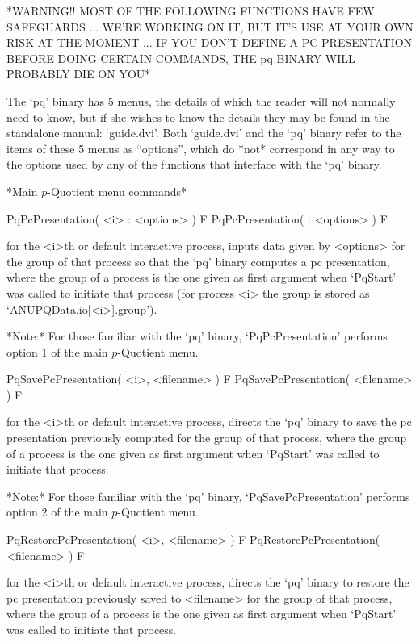 
*WARNING!! MOST OF THE FOLLOWING FUNCTIONS HAVE FEW SAFEGUARDS ... WE'RE
 WORKING ON IT, BUT IT'S USE AT YOUR OWN RISK AT THE MOMENT ... IF YOU
 DON'T DEFINE A PC PRESENTATION BEFORE DOING CERTAIN COMMANDS, THE pq
 BINARY WILL PROBABLY DIE ON YOU*

The `pq' binary has 5 menus, the details of which  the  reader  will  not
normally need to know, but if she wishes to know the details they may  be
found in the standalone manual: `guide.dvi'.  Both  `guide.dvi'  and  the
`pq' binary refer to the items of these 5 menus as ``options'', which  do
*not* correspond in any way to the options used  by  any  of  the  {\GAP}
functions that interface with the `pq' binary.

*Main $p$-Quotient menu commands*

\>PqPcPresentation( <i> : <options> ) F
\>PqPcPresentation( : <options> ) F

for the <i>th or default interactive {\ANUPQ} process, inputs data  given
by <options> for the group of  that  process  so  that  the  `pq'  binary
computes a pc presentation, where the group of a process is the one given
as first argument when `PqStart' was called to initiate that process (for
process <i> the group is stored as `ANUPQData.io[<i>].group').

*Note:* For those  familiar  with  the  `pq'  binary,  `PqPcPresentation'
performs option 1 of the main $p$-Quotient menu.

\>PqSavePcPresentation( <i>, <filename> ) F
\>PqSavePcPresentation( <filename> ) F

for the <i>th or default interactive {\ANUPQ} process, directs  the  `pq'
binary to save the pc presentation previously computed for the  group  of
that process, where the group of a process is  the  one  given  as  first
argument when `PqStart' was called to initiate that process.

*Note:* For those familiar with the `pq'  binary,  `PqSavePcPresentation'
performs option 2 of the main $p$-Quotient menu.

\>PqRestorePcPresentation( <i>, <filename> ) F
\>PqRestorePcPresentation( <filename> ) F

for the <i>th or default interactive {\ANUPQ} process, directs  the  `pq'
binary to restore the pc presentation previously saved to <filename>  for
the group of that process, where the group of a process is the one  given
as first argument when `PqStart' was called to initiate that process.

